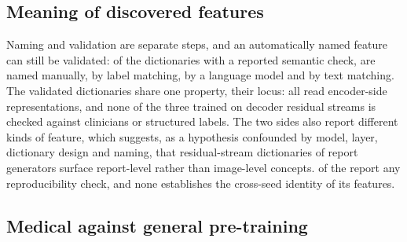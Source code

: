 \subsection{Meaning of discovered features}

Naming and validation are separate steps, and an automatically
named feature can still be validated: of the \Nsaeval{} dictionaries with a reported semantic check,
\Nsaemanual{} are named manually, \Nsaelabmatch{} by label matching, \Nsaellm{} by a language model and
\Nsaetext{} by text matching. The validated dictionaries share one property, their locus: all read
encoder-side representations, and none of the three trained on decoder residual streams is checked
against clinicians or structured labels. The two sides also report different kinds of feature, which
suggests, as a hypothesis confounded by model, layer, dictionary design and naming, that
residual-stream dictionaries of report generators surface report-level rather than image-level
concepts. \Nsaestab{} of the \Nsae{} report any reproducibility check, and none establishes the
cross-seed identity of its features.

\subsection{Medical against general pre-training}

